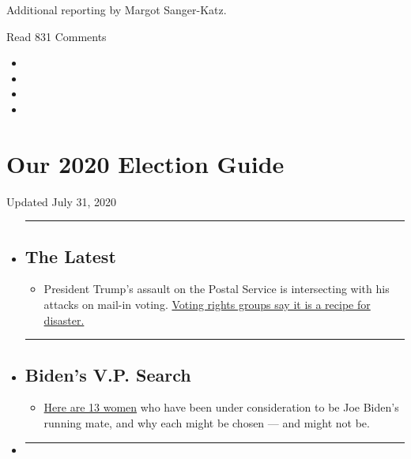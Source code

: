 Additional reporting by Margot Sanger-Katz.

Read 831 Comments

\begin{itemize}
\item
\item
\item
\item
\end{itemize}

\hypertarget{our-2020-election-guide}{%
\section{Our 2020 Election Guide}\label{our-2020-election-guide}}

Updated July 31, 2020

\begin{itemize}
\item
  \begin{center}\rule{0.5\linewidth}{\linethickness}\end{center}

  \hypertarget{the-latest}{%
  \subsection{The Latest}\label{the-latest}}

  \begin{itemize}
  \tightlist
  \item
    President Trump's assault on the Postal Service is intersecting with
    his attacks on mail-in voting.
    \href{https://www.nytimes.com/2020/07/31/us/politics/trump-usps-mail-delays.html?action=click\&pgtype=Article\&state=default\&region=BELOW_MAIN_CONTENT\&context=storylines_guide}{Voting
    rights groups say it is a recipe for disaster.}
  \end{itemize}
\item
  \begin{center}\rule{0.5\linewidth}{\linethickness}\end{center}

  \hypertarget{bidens-vp-search}{%
  \subsection{Biden's V.P. Search}\label{bidens-vp-search}}

  \begin{itemize}
  \tightlist
  \item
    \href{https://www.nytimes.com/article/biden-vice-president-2020.html?action=click\&pgtype=Article\&state=default\&region=BELOW_MAIN_CONTENT\&context=storylines_guide}{Here
    are 13 women} who have been under consideration to be Joe Biden's
    running mate, and why each might be chosen --- and might not be.
  \end{itemize}
\item
  \begin{center}\rule{0.5\linewidth}{\linethickness}\end{center}


\end{itemize}
